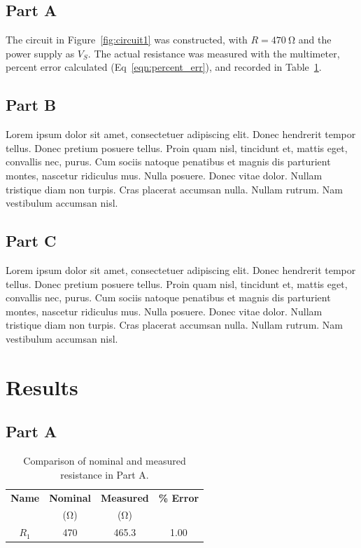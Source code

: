 \documentclass{article}
\begin{document}
\subsection{Part A}
\label{sec:proc_a}

The circuit in Figure~\ref{fig:circuit1} was constructed, with $R =
\SI{470}{\ohm}$ and the power supply as $V_S$.  The actual resistance
was measured with the multimeter, percent error calculated
(Eq~\ref{eqn:percent_err}), and recorded in
Table~\ref{tab:percent_err}.

\subsection{Part B}
\label{sec:proc_b}

Lorem ipsum dolor sit amet, consectetuer adipiscing elit. Donec
hendrerit tempor tellus. Donec pretium posuere tellus. Proin quam
nisl, tincidunt et, mattis eget, convallis nec, purus. Cum sociis
natoque penatibus et magnis dis parturient montes, nascetur ridiculus
mus. Nulla posuere. Donec vitae dolor. Nullam tristique diam non
turpis. Cras placerat accumsan nulla. Nullam rutrum. Nam vestibulum
accumsan nisl.

\subsection{Part C}
\label{sec:proc_c}

Lorem ipsum dolor sit amet, consectetuer adipiscing elit. Donec
hendrerit tempor tellus. Donec pretium posuere tellus. Proin quam
nisl, tincidunt et, mattis eget, convallis nec, purus. Cum sociis
natoque penatibus et magnis dis parturient montes, nascetur ridiculus
mus. Nulla posuere. Donec vitae dolor. Nullam tristique diam non
turpis. Cras placerat accumsan nulla. Nullam rutrum. Nam vestibulum
accumsan nisl.

\section{Results}
\label{sec:results}

\subsection{Part A}
\label{sec:result_a}

\begin{table}[hbtp]
  \centering
  \begin{tabular}{*{4}{c}}
    \textbf{Name} & \textbf{Nominal} & \textbf{Measured} & \textbf{\% Error} \\
    & (\si{\ohm}) & (\si{\ohm}) & \\
    \hline
    $R_1$ & 470 & 465.3 & 1.00 \\
  \end{tabular}
  \caption{\label{tab:percent_err} Comparison of nominal and measured resistance in Part A.}
\end{table}
    
\end{document}
